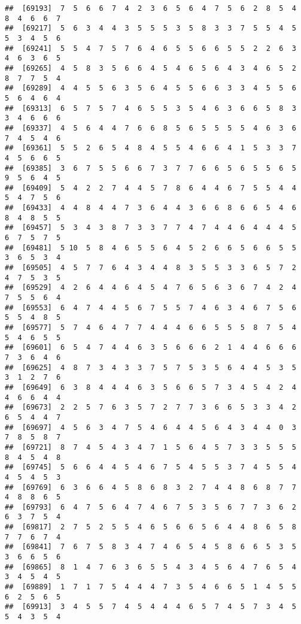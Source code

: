 \documentclass[
]{book}
\begin{document}
\begin{verbatim}
##  [69193]  7  5  6  6  7  4  2  3  6  5  6  4  7  5  6  2  8  5  4  8  4  6  6  7
##  [69217]  5  6  3  4  4  3  5  5  5  3  5  8  3  3  7  5  5  4  5  5  3  4  5  6
##  [69241]  5  5  4  7  5  7  6  4  6  5  5  6  6  5  5  2  2  6  3  4  6  3  6  5
##  [69265]  4  5  8  3  5  6  6  4  5  4  6  5  6  4  3  4  6  5  2  8  7  7  5  4
##  [69289]  4  4  5  5  6  3  5  6  4  5  5  6  6  3  3  4  5  5  6  5  6  4  6  4
##  [69313]  6  5  7  5  7  4  6  5  5  3  5  4  6  3  6  6  5  8  3  3  4  6  6  6
##  [69337]  4  5  6  4  4  7  6  6  8  5  6  5  5  5  5  4  6  3  6  7  4  5  4  6
##  [69361]  5  5  2  6  5  4  8  4  5  5  4  6  6  4  1  5  3  3  7  4  5  6  6  5
##  [69385]  3  6  7  5  5  6  6  7  3  7  7  6  6  5  6  5  5  6  5  9  5  6  4  5
##  [69409]  5  4  2  2  7  4  4  5  7  8  6  4  4  6  7  5  5  4  4  5  4  7  5  6
##  [69433]  4  4  8  4  4  7  3  6  4  4  3  6  6  8  6  6  5  4  6  8  4  8  5  5
##  [69457]  5  3  4  3  8  7  3  3  7  7  4  7  4  4  6  4  4  4  5  6  7  5  7  5
##  [69481]  5 10  5  8  4  6  5  5  6  4  5  2  6  6  5  6  6  5  5  3  6  5  3  4
##  [69505]  4  5  7  7  6  4  3  4  4  8  3  5  5  3  3  6  5  7  2  4  7  5  3  5
##  [69529]  4  2  6  4  4  6  4  5  4  7  6  5  6  3  6  7  4  2  4  7  5  5  6  4
##  [69553]  6  4  7  4  4  5  6  7  5  5  7  4  6  3  4  6  7  5  6  5  5  4  8  5
##  [69577]  5  7  4  6  4  7  7  4  4  4  6  6  5  5  5  8  7  5  4  5  4  6  5  5
##  [69601]  6  5  4  7  4  4  6  3  5  6  6  6  2  1  4  4  6  6  6  7  3  6  4  6
##  [69625]  4  8  7  3  4  3  3  7  5  7  5  3  5  6  4  4  5  3  5  3  1  2  7  6
##  [69649]  6  3  8  4  4  4  6  3  5  6  6  5  7  3  4  5  4  2  4  4  6  6  4  4
##  [69673]  2  2  5  7  6  3  5  7  2  7  7  3  6  6  5  3  3  4  2  6  5  4  4  7
##  [69697]  4  5  6  3  4  7  5  4  6  4  4  5  6  4  3  4  4  0  3  7  8  5  8  7
##  [69721]  8  7  4  5  4  3  4  7  1  5  6  4  5  7  3  3  5  5  5  8  4  5  4  8
##  [69745]  5  6  6  4  4  5  4  6  7  5  4  5  5  3  7  4  5  5  4  4  5  4  5  3
##  [69769]  6  3  6  6  4  5  8  6  8  3  2  7  4  4  8  6  8  7  7  4  8  8  6  5
##  [69793]  6  4  7  5  6  4  7  4  6  7  5  3  5  6  7  7  3  6  2  6  3  7  5  4
##  [69817]  2  7  5  2  5  5  4  6  5  6  6  5  6  4  4  8  6  5  8  7  7  6  7  4
##  [69841]  7  6  7  5  8  3  4  7  4  6  5  4  5  8  6  6  5  3  5  3  6  6  5  6
##  [69865]  8  1  4  7  6  3  6  5  5  4  3  4  5  6  4  7  6  5  4  3  4  5  4  5
##  [69889]  1  7  1  7  5  4  4  4  7  3  5  4  6  6  5  1  4  5  5  6  2  5  6  5
##  [69913]  3  4  5  5  7  4  5  4  4  4  6  5  7  4  5  7  3  4  5  5  4  3  5  4

\end{verbatim}
\end{document}
